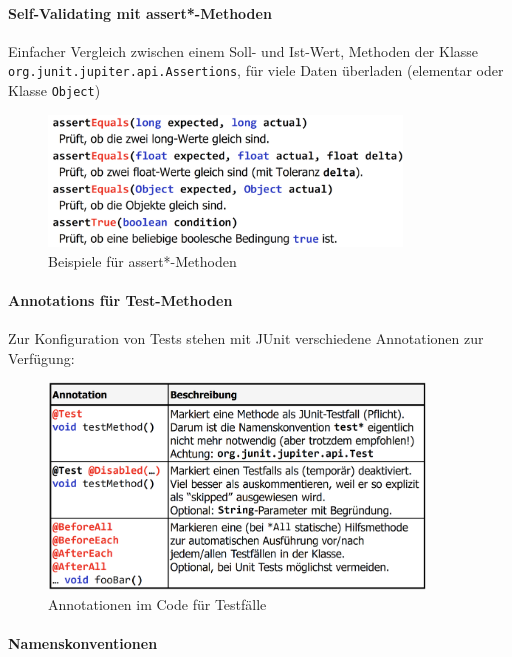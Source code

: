 \documentclass[a4paper]{article}
\begin{document}
				\paragraph{Self-Validating mit assert*-Methoden}
				
				Einfacher Vergleich zwischen einem Soll- und Ist-Wert, Methoden der Klasse \texttt{org.junit.jupiter.api.Assertions}, für viele Daten überladen (elementar oder Klasse \texttt{Object})
				
				\begin{figure}[!htb]
					\centering
					\includegraphics[keepaspectratio, height=3.5cm]{img/testing/test_asserts.png}
					\caption{Beispiele für assert*-Methoden}
					\label{fig:test_asserts}
				\end{figure}
			
				\paragraph{Annotations für Test-Methoden}
				
				Zur Konfiguration von Tests stehen mit JUnit verschiedene Annotationen zur Verfügung:
			
				\begin{figure}[!htb]
					\centering
					\includegraphics[keepaspectratio, height=5.5cm]{img/testing/test_annotations.png}
					\caption{Annotationen im Code für Testfälle}
					\label{fig:test_annotations}
				\end{figure}
			
				\paragraph{Namenskonventionen}
				
\end{document}
